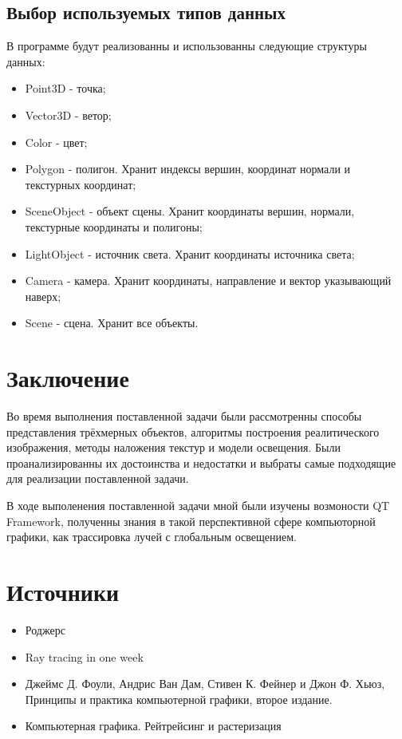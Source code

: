 \documentclass[12pt,a4paper,oneside]{report}
\begin{document}
		\section{Выбор используемых типов данных}
			\quad В программе будут реализованны и использованны следующие структуры данных:
			\begin{itemize}
    				\item Point3D - точка;
    				\item Vector3D - ветор;
    				\item Color - цвет;
    				\item Polygon - полигон. Хранит индексы вершин, координат нормали и  текстурных координат;
    				\item SceneObject - объект сцены. Хранит координаты вершин, нормали, текстурные координаты и полигоны;
    				\item LightObject - источник света. Хранит координаты источника света;
    				\item Camera - камера. Хранит координаты, направление и вектор указывающий наверх;
    				\item Scene - сцена. Хранит все объекты.
    			\end{itemize}
    \chapter{Заключение}
    \quad Во время выполнения поставленной задачи были рассмотренны способы представления трёхмерных объектов, алгоритмы построения реалитического изображения, методы наложения текстур и модели освещения. Были проанализированны их достоинства и недостатки и выбраты самые подходящие для реализации поставленной задачи.
    
    \quad В ходе выполенения поставленной задачи мной были изучены возмоности QT Framework, полученны знания в такой перспективной сфере компьюторной графики, как трассировка лучей с глобальным освещением.
    \chapter{Источники}
    	\begin{itemize}
    		\item Роджерс
    		\item Ray tracing in one week
    		\item Джеймс Д. Фоули, Андрис Ван Дам, Стивен К. Фейнер и Джон Ф.
Хьюз, Принципы и практика компьютерной графики, второе издание.
			\item Компьютерная графика. Рейтрейсинг и растеризация
    	\end{itemize}
\end{document}
